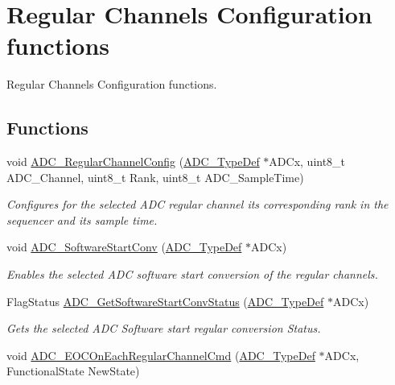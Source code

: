 \hypertarget{group___a_d_c___group4}{}\section{Regular Channels Configuration functions}
\label{group___a_d_c___group4}


Regular Channels Configuration functions.  


\subsection*{Functions}
\begin{DoxyCompactItemize}
\item 
void \hyperlink{group___a_d_c___group4_gac531adb577b648d4bb8881f2ed627d52}{A\+D\+C\+\_\+\+Regular\+Channel\+Config} (\hyperlink{struct_a_d_c___type_def}{A\+D\+C\+\_\+\+Type\+Def} $\ast$A\+D\+Cx, uint8\+\_\+t A\+D\+C\+\_\+\+Channel, uint8\+\_\+t Rank, uint8\+\_\+t A\+D\+C\+\_\+\+Sample\+Time)
\begin{DoxyCompactList}\small\item\em Configures for the selected A\+DC regular channel its corresponding rank in the sequencer and its sample time. \end{DoxyCompactList}\item 
void \hyperlink{group___a_d_c___group4_gac1cd466e725595812c1bbfdad2459ff1}{A\+D\+C\+\_\+\+Software\+Start\+Conv} (\hyperlink{struct_a_d_c___type_def}{A\+D\+C\+\_\+\+Type\+Def} $\ast$A\+D\+Cx)
\begin{DoxyCompactList}\small\item\em Enables the selected A\+DC software start conversion of the regular channels. \end{DoxyCompactList}\item 
Flag\+Status \hyperlink{group___a_d_c___group4_gaf1119583782ecbcec380efcb7eb74883}{A\+D\+C\+\_\+\+Get\+Software\+Start\+Conv\+Status} (\hyperlink{struct_a_d_c___type_def}{A\+D\+C\+\_\+\+Type\+Def} $\ast$A\+D\+Cx)
\begin{DoxyCompactList}\small\item\em Gets the selected A\+DC Software start regular conversion Status. \end{DoxyCompactList}\item 
void \hyperlink{group___a_d_c___group4_ga5316caaa170415ef171c486d8f0bf22d}{A\+D\+C\+\_\+\+E\+O\+C\+On\+Each\+Regular\+Channel\+Cmd} (\hyperlink{struct_a_d_c___type_def}{A\+D\+C\+\_\+\+Type\+Def} $\ast$A\+D\+Cx, Functional\+State New\+State)

\end{DoxyCompactItemize}
